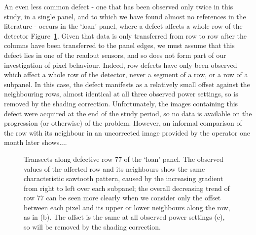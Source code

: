 \documentclass[\main/IO-Pixels.tex]{subfiles}
\begin{document}
An even less common defect - one that has been observed only twice in this study, in a single panel, and to which we have found almost no references in the literature  - occurs in the `loan' panel, where a defect affects a whole row of the detector Figure~\ref{fig:row-defect}. Given that data is only transferred from row to row after the columns have been transferred to the panel edges, we must assume that this defect lies in one of the readout sensors, and so does not form part of our investigation of pixel behaviour. Indeed, row defects have only been observed which affect a whole row of the detector, never a segment of a row, or a row of a subpanel. In this case, the defect manifests as a relatively small offset against the neighbouring rows, almost identical at all three observed power settings, so is removed by the shading correction. Unfortunately, the images containing this defect were acquired at the end of the study period, so no data is available on the progression (or otherwise) of the problem. However, an informal comparison of the row with its neighbour in an uncorrected image provided by the operator one month later shows.... 



\begin{figure}
\caption{Transects along defective row 77 of the `loan' panel. The observed values of the affected row and its neighbours show the same characteristic sawtooth pattern, caused by the increasing gradient from right to left over each subpanel; the overall decreasing trend of row 77 can be seen more clearly when we consider only the offset between each pixel and its upper or lower neighbours along the row, as in (b). The offset is the same at all observed power settings (c), so will be removed by the shading correction.}
\label{fig:row-defect}

%
%
%

\end{figure}
\end{document}
